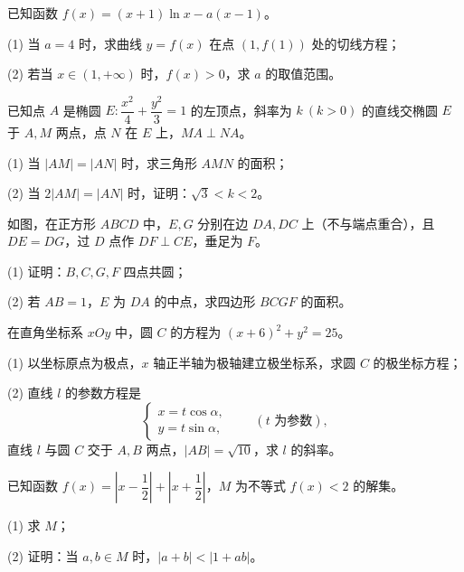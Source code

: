 \begin{question}
已知函数 $f(x)=(x+1)\ln x-a(x-1)$。

   (1) 当 $a=4$ 时，求曲线 $y=f(x)$ 在点 $(1,f(1))$ 处的切线方程；

   (2) 若当 $x\in(1,+\infty)$ 时，$f(x)>0$，求 $a$ 的取值范围。

\end{question}
\begin{question}
已知点 $A$ 是椭圆 $E:\dfrac{x^2}{4}+\dfrac{y^2}{3}=1$ 的左顶点，斜率为 $k\ (k>0)$ 的直线交椭圆 $E$ 于 $A,M$ 两点，点 $N$ 在 $E$ 上，$MA\perp NA$。

   (1) 当 $|AM|=|AN|$ 时，求三角形 $AMN$ 的面积；

   (2) 当 $2|AM|=|AN|$ 时，证明：$\sqrt3<k<2$。

\Needspace{0.4\textheight}
\end{question}
\begin{question}
如图，在正方形 $ABCD$ 中，$E,G$ 分别在边 $DA,DC$ 上（不与端点重合），且 $DE=DG$，过 $D$ 点作 $DF\perp CE$，垂足为 $F$。
\nopagebreak[4]
\begin{center}\end{center}
\nopagebreak[4]
   (1) 证明：$B,C,G,F$ 四点共圆；

   (2) 若 $AB=1$，$E$ 为 $DA$ 的中点，求四边形 $BCGF$ 的面积。

\end{question}
\begin{question}
在直角坐标系 $xOy$ 中，圆 $C$ 的方程为 $(x+6)^2+y^2=25$。

   (1) 以坐标原点为极点，$x$ 轴正半轴为极轴建立极坐标系，求圆 $C$ 的极坐标方程；

   (2) 直线 $l$ 的参数方程是
\nopagebreak[4]
   \[
   \begin{cases}
   x=t\cos\alpha,\\
   y=t\sin\alpha,
   \end{cases}\qquad(t\text{ 为参数}),
   \]
   直线 $l$ 与圆 $C$ 交于 $A,B$ 两点，$|AB|=\sqrt{10}$，求 $l$ 的斜率。

\end{question}
\begin{question}
已知函数 $f(x)=\left|x-\dfrac12\right|+\left|x+\dfrac12\right|$，$M$ 为不等式 $f(x)<2$ 的解集。

   (1) 求 $M$；

   (2) 证明：当 $a,b\in M$ 时，$|a+b|<|1+ab|$。

\end{question}